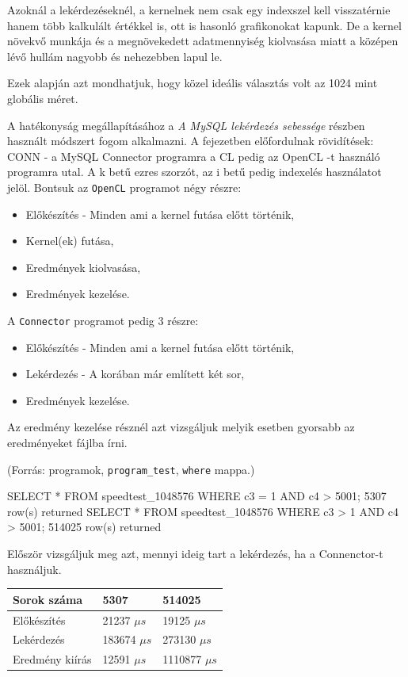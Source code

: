 Azoknál a lekérdezéseknél, a kernelnek nem csak egy indexszel kell visszatérnie hanem több kalkulált értékkel is, ott is hasonló grafikonokat kapunk. De a kernel növekvő munkája és a megnövekedett adatmennyiség kiolvasása miatt a középen lévő hullám nagyobb és nehezebben lapul le.

Ezek alapján azt mondhatjuk, hogy közel ideális választás volt az 1024 mint globális méret.


A hatékonyság megállapításához a \textit{A MySQL lekérdezés sebessége} részben használt módszert fogom alkalmazni.
A fejezetben előfordulnak rövidítések: CONN - a MySQL Connector programra a CL pedig az OpenCL -t használó programra utal. 
A k betű ezres szorzót, az i betű pedig indexelés használatot jelöl.
\newline Bontsuk az \texttt{OpenCL} programot négy részre:
\begin{itemize}
\item Előkészítés - Minden ami a kernel futása előtt történik,
\item Kernel(ek) futása,
\item Eredmények kiolvasása,
\item Eredmények kezelése.
\end{itemize}
A \texttt{Connector} programot pedig 3 részre:
\begin{itemize}
\item Előkészítés - Minden ami a kernel futása előtt történik,
\item Lekérdezés - A korában már említett két sor,
\item Eredmények kezelése.
\end{itemize}
Az eredmény kezelése résznél azt vizsgáljuk melyik esetben gyorsabb az eredményeket fájlba írni.


(Forrás: programok, \texttt{program\_test}, \texttt{where} mappa.)

\begin{python}
SELECT * FROM speedtest_1048576 WHERE c3 = 1 AND c4 > 5001;
	5307 row(s) returned
SELECT * FROM speedtest_1048576 WHERE c3 > 1 AND c4 > 5001;
	514025 row(s) returned
\end{python}
Először vizsgáljuk meg azt, mennyi ideig tart a lekérdezés, ha a Connenctor-t használjuk.

\begin{table}[h!]
\centering
\begin{tabular}{|p{6cm}|p{3cm}|p{3cm}|}
\hline
Sorok száma & 5307 & 514025 \\
\hline\hline

Előkészítés & 21237 $\mu s$ & 19125 $\mu s$ \\
\hline

Lekérdezés & 183674 $\mu s$ & 273130 $\mu s$ \\
\hline

Eredmény kiírás & 12591 $\mu s$ & 1110877 $\mu s$ \\
\hline
\end{tabular}
\end{table}

